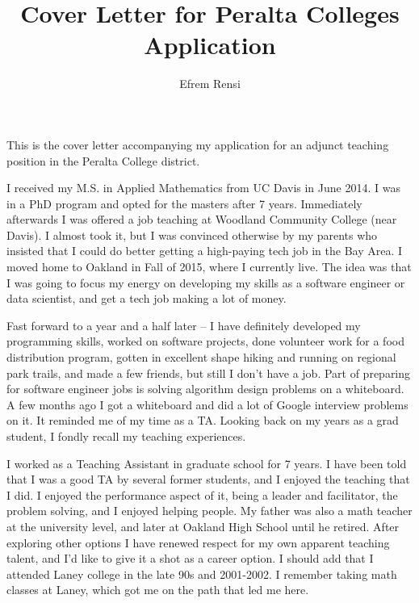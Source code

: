 \documentclass{article}
\title{Cover Letter for Peralta Colleges Application}
\date{}
\author{Efrem Rensi}
\begin{document}
\doublespacing
\maketitle
This is the cover letter accompanying my application for an adjunct teaching position in the Peralta College district.

I received my M.S. in Applied Mathematics from UC Davis in June 2014.  I was in a PhD program and opted for the masters after 7 years.  Immediately afterwards I was offered a job teaching at Woodland Community College (near Davis). I almost took it, but I was convinced otherwise by my parents who insisted that I could do better getting a high-paying tech job in the Bay Area.  I moved home to Oakland in Fall of 2015, where I currently live.   The idea was that I was going to focus my energy on developing my skills as a software engineer or data scientist, and get a tech job making a lot of money.

Fast forward to a year and a half later -- I have definitely developed my programming skills, worked on software projects, done volunteer work for a food distribution program, gotten in excellent shape hiking and running on regional park trails, and made a few friends, but still I don't have a job.  Part of preparing for software engineer jobs is solving algorithm design problems on a whiteboard. A few months ago I got a whiteboard and did a lot of Google interview problems on it.  It reminded me of my time as a TA.  Looking back on my years as a grad student, I fondly recall my teaching experiences.

I worked as a Teaching Assistant in graduate school for 7 years. I have been told that I was a good TA by several former students, and I enjoyed the teaching that I did.  I enjoyed the performance aspect of it, being a leader and facilitator, the problem solving, and I enjoyed helping people.  My father was also a math teacher at the university level, and later at Oakland High School until he retired.  After exploring other options I have renewed respect for my own apparent teaching talent, and I'd like to give it a shot as a career option.  I should add that I attended Laney college in the late 90s and 2001-2002.  I remember taking math classes at Laney, which got me on the path that led me here.
\end{document}
